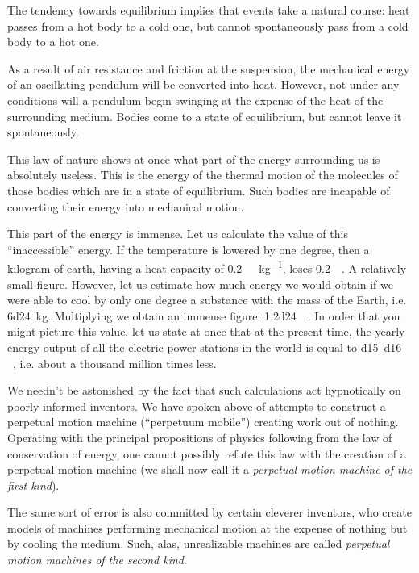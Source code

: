 The tendency towards equilibrium implies that events take a natural course: heat passes from a hot body to a cold one, but cannot spontaneously pass from a cold bo­dy to a hot one.

As a result of air resistance and friction at the suspen­sion, the mechanical energy of an oscillating pendulum will be converted into heat. However, not under any con­ditions will a pendulum begin swinging at the expense of the heat of the surrounding medium. Bodies come to a state of equilibrium, but cannot leave it spontaneously.

This law of nature shows at once what part of the energy surrounding us is absolutely useless. This is the energy of the thermal motion of the molecules of those bodies which are in a state of equilibrium. Such bodies are incapable of converting their energy into mechanical motion.

This part of the energy is immense. Let us calculate the value of this ``inaccessible'' energy. If the tempera­ture is lowered by one degree, then a kilogram of earth, having a heat capacity of \SI{0.2}{\kilo\calorie\per\kilo\gram}, loses \SI{0.2}{\kilo\calorie}. A relatively small figure. However, let us estimate how much energy we would obtain if we were able to cool by only one degree a substance with the mass of the Earth, i.e. \SI{6d24}{\kilo\gram}. Multiplying we obtain an im­mense figure: \SI{1.2d24}{\kilo\calorie}. In order that you might picture this value, let us state at once that at the present time, the yearly energy output of all the electric power stations in the world is equal to \numrange{d15}{d16} \si{\kilo\calorie}, i.e. about a thousand million times less.

We needn’t be astonished by the fact that such calcu­lations act hypnotically on poorly informed inventors. We have spoken above of attempts to construct a perpet­ual motion machine (``perpetuum mobile'') creating work out of nothing. Operating with the principal proposi­tions of physics following from the law of conservation of energy, one cannot possibly refute this law with the creation of a perpetual motion machine (we shall now call it a \emph{perpetual motion machine of the first kind}).

The same sort of error is also committed by certain cleverer inventors, who create models of machines performing mechanical motion at the expense of nothing but by cooling the medium. Such, alas, unrealizable machines are called \emph{perpetual motion machines of the second kind}. 

